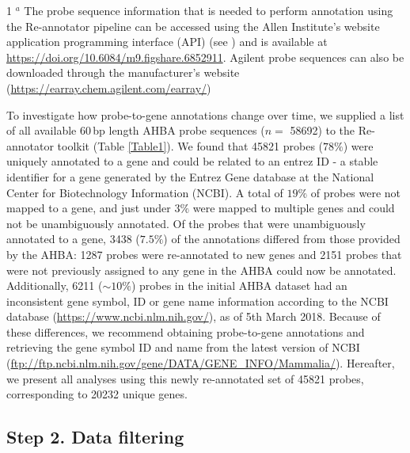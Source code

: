 \documentclass[10pt,A4]{article}
\begin{document}
\begin{table}[h!]
{\begin{tabular}{ll}
\end{tabular}}
\begin{tablenotes}
     \item[1] $^{a}$ The probe sequence information that is needed to perform annotation using the Re-annotator pipeline can be accessed using the Allen Institute’s website application programming interface (API) (see ) and is available at \url{https://doi.org/10.6084/m9.figshare.6852911}. Agilent probe sequences can also be downloaded  through the manufacturer's website (\url{https://earray.chem.agilent.com/earray/})
   \end{tablenotes}
\end{table}

To investigate how probe-to-gene annotations change over time, we supplied a list of all available $60$\,bp length AHBA probe sequences ($n =$ \num{58692}) to the Re-annotator toolkit \citep{Arloth2015} (Table \ref{Table1}). We found that \num{45821} probes ($78\%$) were uniquely annotated to a gene and could be related to an entrez ID - a stable identifier for a gene generated by the Entrez Gene database at the National Center for Biotechnology Information (NCBI). A total of $19\%$ of probes were not mapped to a gene, and just under $3\%$ were mapped to multiple genes and could not be unambiguously annotated. Of the probes that were unambiguously annotated to a gene, \num{3438} ($7.5\%$) of the annotations differed from those provided by the AHBA: \num{1287} probes were re-annotated to new genes and \num{2151} probes that were not previously assigned to any gene in the AHBA could now be annotated. Additionally, \num{6211} ($\sim10\%$) probes in the initial AHBA dataset had an inconsistent gene symbol, ID or gene name information according to the NCBI database (\url{https://www.ncbi.nlm.nih.gov/}), as of 5th March 2018. Because of these differences, we recommend obtaining probe-to-gene annotations and retrieving the gene symbol ID and name from the latest version of NCBI (\url{ftp://ftp.ncbi.nlm.nih.gov/gene/DATA/GENE_INFO/Mammalia/}). Hereafter, we present all analyses using this newly re-annotated set of \num{45821} probes, corresponding to \num{20232} unique genes.

\subsection*{Step 2. Data filtering}
\end{document}
